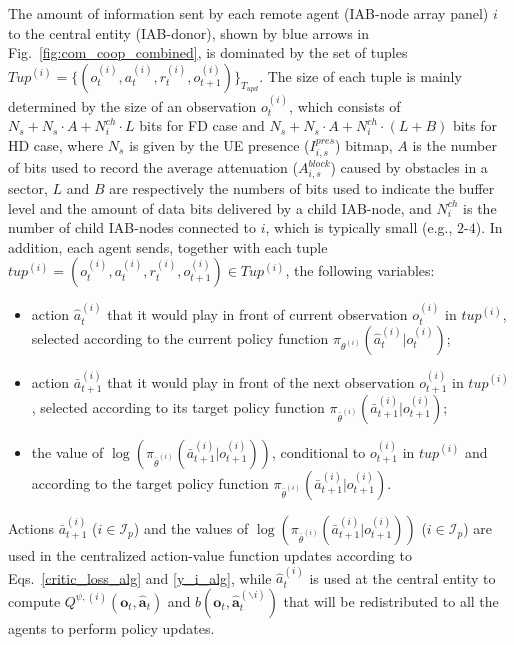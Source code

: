 The amount of information sent by each remote agent (IAB-node array panel) $i$ to the central entity (IAB-donor), shown by blue arrows  in Fig.~\ref{fig:com_coop_combined}, is dominated by the set of tuples $Tup^{(i)}=\{(o^{(i)}_t, a^{(i)}_t, r^{(i)}_t, o^{(i)}_{t+1})\}_{T_{upd}}$. The size of each tuple is mainly determined by the size of an observation $o^{(i)}_t$, which consists of $N_s + N_s\cdot A + N^{ch}_{i}\cdot L$ bits for FD case and $N_s + N_s\cdot A + N^{ch}_{i}\cdot(L + B)$ bits for HD case, where $N_s$ is given by the UE presence ($I_{i,s}^{pres}$) bitmap, $A$ is the number of bits used to record the average attenuation ($A^{block}_{i,s}$) caused by obstacles in a sector, $L$ and $B$ are respectively the numbers of bits used to indicate the buffer level and the amount of data bits delivered by a child IAB-node, and $N^{ch}_i$ is the number of child IAB-nodes connected to $i$, which is typically small (e.g., $2$-$4$).
In addition, each agent sends, together with each tuple $tup^{(i)}=(o^{(i)}_t, a^{(i)}_t, r^{(i)}_t, o^{(i)}_{t+1})\in Tup^{(i)}$, the following variables:
\begin{itemize}
    \item action $\hat{a}^{(i)}_t$ that it would play in front of current observation $o^{(i)}_t$ in $tup^{(i)}$, selected according to the current policy function $\pi_{\theta^{(i)}}(\hat{a}^{(i)}_t | o^{(i)}_t)$;
    \item action $\bar{a}^{(i)}_{t+1}$ that it would play in front of the next observation $o^{(i)}_{t+1}$ in $tup^{(i)}$, selected according to its target policy function $\pi_{\bar{\theta}^{(i)}}(\bar{a}^{(i)}_{t+1} | o^{(i)}_{t+1})$; 
    \item the value of $\log(\pi_{\bar{\theta}^{(i)}}(\bar{a}^{(i)}_{t+1}|o^{(i)}_{t+1}))$, conditional to $o^{(i)}_{t+1}$ in $tup^{(i)}$ and according to the target policy function $\pi_{\bar{\theta}^{(i)}}(\bar{a}^{(i)}_{t+1}|o^{(i)}_{t+1})$. 
\end{itemize}
Actions $\bar{a}^{(i)}_{t+1}$ ($i\in\mathcal{I}_p$) and the values of $\log(\pi_{\bar{\theta}^{(i)}}(\bar{a}^{(i)}_{t+1}|o^{(i)}_{t+1}))$ ($i\in\mathcal{I}_p$) are used in the centralized action-value function updates according to Eqs.~\eqref{critic_loss_alg} and \eqref{y_i_alg}, while $\hat{a}^{(i)}_t$ is used at the central entity to compute $Q^{\psi,(i)}(\mathbf{o}_t,\mathbf{\hat{a}}_t)$ and $b(\mathbf{o}_t,\mathbf{\hat{a}}^{(\backslash i)}_t)$ that will be redistributed to all the agents to perform policy updates.

